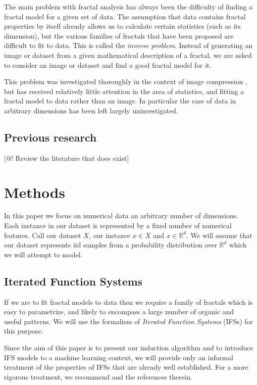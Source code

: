 \documentclass[10pt]{article}
\theoremstyle{definition}
\begin{document}
The main problem with fractal analysis has always been the difficulty of finding a fractal model for a given set of data. The assumption that data contains fractal properties by itself already allows us to calculate certain statistics (such as its dimension), but the various families of fractals that have been proposed are difficult to fit to data. This is called the \emph{inverse problem}. Instead of generating an image or dataset from a given mathematical description of a fractal, we are asked to consider an image or dataset and find a good fractal model for it.

This problem was investigated thoroughly in the context of image compression \cite{hart1996fractal}, but has received relatively little attention in the area of statistics, and fitting a fractal model to data rather than an image. In particular the case of data in arbitrary dimensions has been left largely uninvestigated.

\subsection{Previous research}
[@! Review the literature that does exist]

\section{Methods}

In this paper we focus on numerical data an arbitrary number of dimensions. Each instance in our dataset is represented by a fixed number of numerical features. Call our dataset $X$, our instance $x \in X$ and $x \in {\mathbb R}^d$. We will assume that our dataset represents iid samples from a probability distribution over ${\mathbb R}^d$ which we will attempt to model.

\subsection{Iterated Function Systems}

If we are to fit fractal models to data then we require a family of fractals which is easy to parametrize, and likely to encompass a large number of organic and useful patterns. We will use the formalism of \emph{Iterated Function Systems} (IFSs) for this purpose. 

Since the aim of this paper is to present our induction algorithm and to introduce IFS models to a machine learning context, we will provide only an informal treatment of the properties of IFSs that are already well established. For a more rigorous treatment, we recommend \cite{hutchinson2000deterministic} and the references therein.
\end{document}
